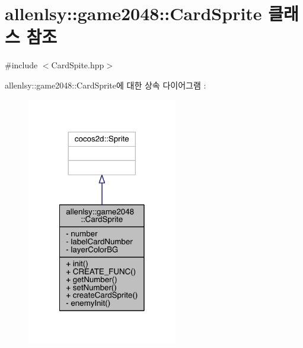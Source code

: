 \hypertarget{classallenlsy_1_1game2048_1_1_card_sprite}{}\section{allenlsy\+:\+:game2048\+:\+:Card\+Sprite 클래스 참조}
\label{classallenlsy_1_1game2048_1_1_card_sprite}


{\ttfamily \#include $<$Card\+Spite.\+hpp$>$}



allenlsy\+:\+:game2048\+:\+:Card\+Sprite에 대한 상속 다이어그램 \+: 
\nopagebreak
\begin{figure}[H]
\begin{center}
\leavevmode
\includegraphics[width=186pt]{df/d6a/classallenlsy_1_1game2048_1_1_card_sprite__inherit__graph}
\end{center}
\end{figure}


